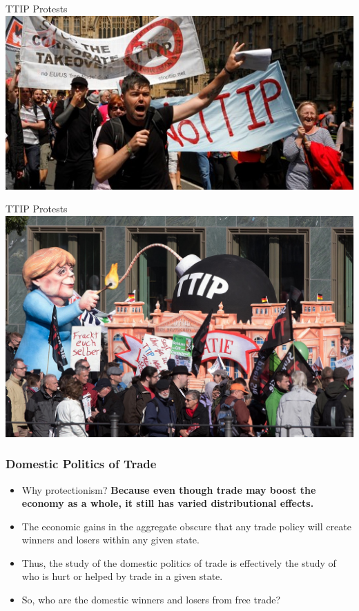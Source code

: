 \documentclass[handout]{beamer}
\begin{document}
\begin{frame}{\LARGE TTIP Protests}
	\centering
	\includegraphics[width=\textwidth,height=0.8\textheight,keepaspectratio]{ttip1.jpg}
\end{frame}

\begin{frame}{\LARGE TTIP Protests}
	\centering
	\includegraphics[width=\textwidth,height=0.8\textheight,keepaspectratio]{TTIP-Protests-Berlin.jpg}
\end{frame}

\begin{frame} 
	\frametitle{\LARGE{Domestic Politics of Trade}}
	\begin{itemize}
		\item Why protectionism? \textbf{Because even though trade may boost the economy as a whole, it still has varied distributional effects.} \pause
		\item The economic gains in the aggregate obscure that any trade policy will create winners and losers within any given state. \pause
		\item Thus, the study of the domestic politics of trade is effectively the study of who is hurt or helped by trade in a given state. \pause
		\item So, who are the domestic winners and losers from free trade?
	\end{itemize}
\end{frame}
\end{document}

